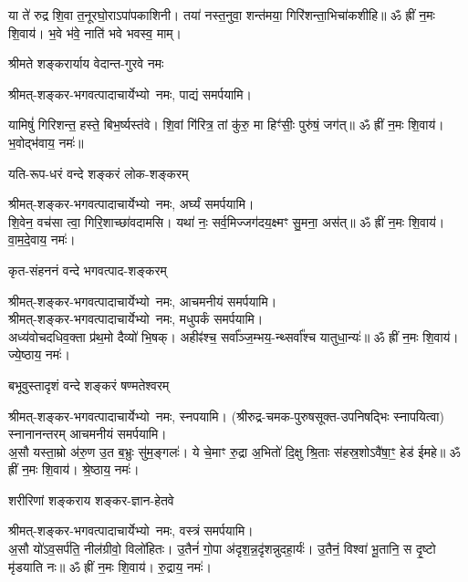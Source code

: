 \begin{center}
या ते॑ रुद्र शि॒वा त॒नूरघो॒राऽपा॑पकाशिनी। तया॑ नस्त॒नुवा॒ शन्त॑मया॒ गिरि॑शन्ता॒\-भिचा॑कशीहि॥ ॐ ह्रीं न॒मः शि॒वाय॑। भ॒वे भ॑वे॒ नाति॑ भवे भवस्व॒ माम्।

{श्रीमते शङ्करार्याय वेदान्त-गुरवे नमः}

श्रीमत्-शङ्कर-भगवत्पादाचार्येभ्यो~नमः, पाद्यं समर्पयामि।

यामिषुं॑ गिरिशन्त॒ हस्ते॒ बिभ॒र्ष्यस्त॑वे। शि॒वां गि॑रित्र॒ तां कु॑रु॒ मा हिꣳ॑सीः॒ पुरु॑षं॒ जग॑त्॥ ॐ ह्रीं न॒मः शि॒वाय॑। भ॒वोद्भ॑वाय॒ नमः॑॥ 

{यति-रूप-धरं वन्दे शङ्करं लोक-शङ्करम्}

श्रीमत्-शङ्कर-भगवत्पादाचार्येभ्यो~नमः, अर्घ्यं समर्पयामि।\\

शि॒वेन॒ वच॑सा त्वा॒ गिरि॒शाच्छा॑वदामसि। यथा॑ नः॒ सर्व॒मिज्जग॑दय॒क्ष्मꣳ सु॒मना॒ अस॑त्॥ ॐ ह्रीं न॒मः शि॒वाय॑। वा॒म॒दे॒वाय॒ नमः॑। 

{कृत-संहननं वन्दे भगवत्पाद-शङ्करम्}

श्रीमत्-शङ्कर-भगवत्पादाचार्येभ्यो~नमः, आचमनीयं समर्पयामि।\\
श्रीमत्-शङ्कर-भगवत्पादाचार्येभ्यो~नमः, मधुपर्कं समर्पयामि।\\

अध्य॑वोचदधिव॒क्ता प्र॑थ॒मो दैव्यो॑ भि॒षक्। अहीꣴ॑श्च॒ सर्वा᳚ञ्ज॒म्भय॒-न्थ्सर्वा᳚श्च यातुधा॒न्यः॑॥ ॐ ह्रीं न॒मः शि॒वाय॑। ज्ये॒ष्ठाय॒ नमः॑। 

{बभूवुस्तादृशं वन्दे शङ्करं षण्मतेश्वरम्}

श्रीमत्-शङ्कर-भगवत्पादाचार्येभ्यो~नमः, स्नपयामि। (श्रीरुद्र-चमक-पुरुषसूक्त-उपनिषद्भिः स्नापयित्वा) स्नानानन्तरम् आचमनीयं समर्पयामि।\\


अ॒सौ यस्ता॒म्रो अ॑रु॒ण उ॒त ब॒भ्रुः सु॑म॒ङ्गलः॑। ये चे॒माꣳ रु॒द्रा अ॒भितो॑ दि॒क्षु श्रि॒ताः स॑हस्र॒शोऽवै॑षा॒ꣳ॒ हेड॑ ईमहे॥ ॐ ह्रीं न॒मः शि॒वाय॑। श्रे॒ष्ठाय॒ नमः॑। 

{शरीरिणां शङ्कराय शङ्कर-ज्ञान-हेतवे}

श्रीमत्-शङ्कर-भगवत्पादाचार्येभ्यो~नमः, वस्त्रं समर्पयामि।\\

अ॒सौ यो॑ऽव॒सर्प॑ति॒ नील॑ग्रीवो॒ विलो॑हितः। उ॒तैनं॑ गो॒पा अ॑दृश॒न्न॒दृ॑शन्नुदहा॒र्यः॑। उ॒तैनं॒ विश्वा॑ भू॒तानि॒ स दृ॒ष्टो मृ॑डयाति नः॥ ॐ ह्रीं न॒मः शि॒वाय॑। रु॒द्राय॒ नमः॑।


\end{center}
